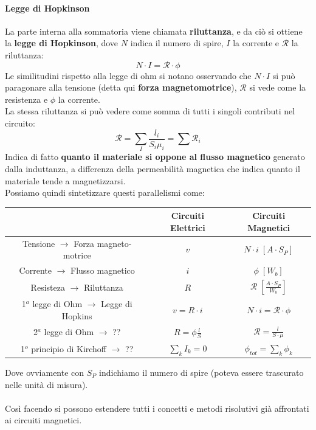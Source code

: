 \documentclass[../main.tex]{subfiles}
\begin{document}
	\paragraph{Legge di Hopkinson}
	La parte interna alla sommatoria viene chiamata \textbf{riluttanza}, e da ciò si ottiene la \textbf{legge di Hopkinson}, dove $N$ indica il numero di spire, $I$ la corrente e $\mathscr{R}$ la riluttanza:
	\begin{equation}
		N\cdot I = \mathscr{R} \cdot \phi	
	\end{equation}
	Le similitudini rispetto alla legge di ohm si notano osservando che $N \cdot I$ si può paragonare alla tensione (detta qui \textbf{forza magnetomotrice}), $\mathscr{R}$ si vede come la resistenza e $\phi$ la corrente.\\
	La stessa riluttanza si può vedere come somma di tutti i singoli contributi nel circuito:
	\begin{equation}
		\mathscr{R}=\sum_I \frac{l_i}{S_i\mu_i}=\sum \mathscr{R}_i	
	\end{equation}
	Indica di fatto \textbf{quanto il materiale si oppone al flusso magnetico} generato dalla induttanza, a differenza della permeabilità magnetica che indica quanto il materiale tende a magnetizzarsi.\\
	Possiamo quindi sintetizzare questi parallelismi come:
	\begin{center}
		\begin{tabular}{|c|c|c|}
			\hline
			& \textbf{Circuiti Elettrici} & \textbf{Circuiti Magnetici} \\
			\hline
			Tensione $\rightarrow$ Forza magneto-motrice & $v$ & $N \cdot i \; \left[ A \cdot S_P \right] $ \\
			\hline
			Corrente $\rightarrow$ Flusso magnetico & $i$ & $\phi \; \left[ W_b \right]$ \\
			\hline
			Resisteza $\rightarrow$ Riluttanza & $R$ & $\mathscr{R} \; \left[ \frac{A \cdot S_P}{W_b} \right]$ \\
			\hline
			1$^a$ legge di Ohm $\rightarrow$ Legge di Hopkins & $v = R \cdot i$ & $N \cdot i = \mathscr{R} \cdot \phi$ \\
			\hline
			2$^a$ legge di Ohm $\rightarrow$ ?? & $R = \phi \frac{l}{S}$ & $\mathscr{R} = \frac{l}{S \cdot \mu}$\\
			\hline
			1$^o$ principio di Kirchoff $\rightarrow$ ?? & $\sum_k I_k = 0$ & $\phi_{tot} = \sum_{k} \phi_k$\\
			\hline
		\end{tabular}
	\end{center}
	Dove ovviamente con $S_P$ indichiamo il numero di spire (poteva essere trascurato nelle unità di misura).\\\\
	Così facendo si possono estendere tutti i concetti e metodi risolutivi già affrontati ai circuiti magnetici.
\end{document}
